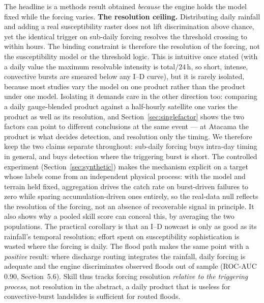 \documentclass[authoryear,preprint,review,12pt]{elsarticle}
\begin{document}
The headline is a methods result obtained \emph{because} the engine holds the
model fixed while the forcing varies. \textbf{The resolution ceiling.}
Distributing daily rainfall and adding a real susceptibility raster does not lift
discrimination above chance, yet the identical trigger on sub-daily forcing
resolves the threshold crossing to within hours. The binding constraint is
therefore the resolution of the forcing, not the susceptibility model or the
threshold logic. This is intuitive once stated (with a daily value the maximum
resolvable intensity is total$/24$\,h, so short, intense, convective bursts are
smeared below any I--D curve), but it is rarely isolated, because most studies
vary the model on one product rather than the product under one model. Isolating it
demands care in the other direction too: comparing a daily gauge-blended product
against a half-hourly satellite one varies the product as well as its resolution,
and Section~\ref{sec:singlefactor} shows the two factors can point to different
conclusions at the same event --- at Atacama the product is what decides detection,
and resolution only the timing. We therefore keep the two claims separate
throughout: sub-daily forcing buys intra-day timing in general, and buys detection
where the triggering burst is short. The
controlled experiment (Section~\ref{sec:synthetic}) makes the mechanism explicit on
a target whose labels come from an independent physical process: with the model and
terrain held fixed, aggregation drives the catch rate on burst-driven failures to
zero while sparing accumulation-driven ones entirely, so the real-data null
reflects the resolution of the forcing, not an absence of recoverable signal in
principle. It also shows why a pooled skill score can conceal this, by averaging
the two populations. The practical corollary is that an I--D nowcast is only as good as its
rainfall's temporal resolution; effort spent on susceptibility sophistication is
wasted where the forcing is daily. The flood path makes the same point with a
\emph{positive} result: where discharge routing integrates the rainfall, daily
forcing is adequate and the engine discriminates observed floods out of sample
(ROC-AUC 0.90, Section~5.6). Skill thus tracks forcing resolution \emph{relative to
the triggering process}, not resolution in the abstract, a daily product that is
useless for convective-burst landslides is sufficient for routed floods.
\end{document}

